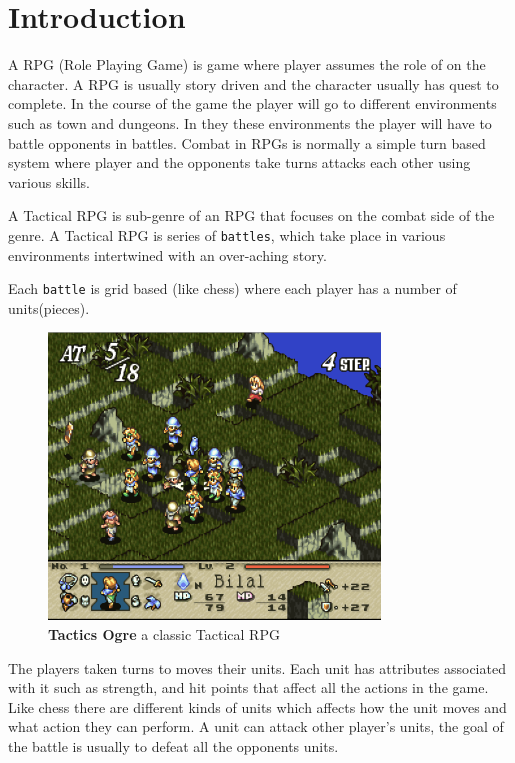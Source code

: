 
\renewcommand{\theTitle}{A Tactical RPG Engine}
\renewcommand{\theAuthor}{\fullName}

 
\maketitle


\section{Introduction} 
\label{introduction}


A RPG (Role Playing Game) is game where player assumes the role of on the character. A RPG is usually story driven and the character usually has quest to complete. In the course of the game the player will go to different environments such as town and dungeons. In they these environments the player will have to battle opponents in battles. Combat in RPGs is normally a simple turn based system where player and the opponents take turns attacks each other using various skills. 

A Tactical RPG is sub-genre of an RPG that focuses on the combat side of the genre. A Tactical RPG is series of \texttt{battles}, which take place in various environments intertwined with an over-aching story.

Each \texttt{battle} is grid based (like chess) where each player has a number of units(pieces). 
\begin{figure}
	[htbp] \centering 
	\includegraphics[height=3in]{figures/TRPG.png} \caption{\textbf{Tactics Ogre}\cite{to} a classic Tactical RPG } \label{fig:figures_TRPG} 
\end{figure}
The players taken turns to moves their units. Each unit has attributes associated with it such as strength, and hit points that affect all the actions in the game. Like chess there are different kinds of units which affects how the unit moves and what action they can perform. A unit can attack other player's units, the goal of the battle is usually to defeat all the opponents units.

